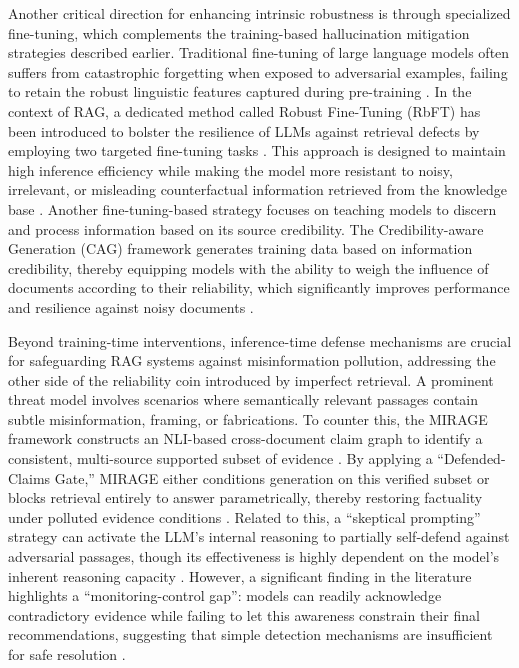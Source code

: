 \documentclass[11pt]{article}
\begin{document}
Another critical direction for enhancing intrinsic robustness is through specialized fine-tuning, which complements the training-based hallucination mitigation strategies described earlier. Traditional fine-tuning of large language models often suffers from catastrophic forgetting when exposed to adversarial examples, failing to retain the robust linguistic features captured during pre-training \cite{ref209}. In the context of RAG, a dedicated method called Robust Fine-Tuning (RbFT) has been introduced to bolster the resilience of LLMs against retrieval defects by employing two targeted fine-tuning tasks \cite{ref210}. This approach is designed to maintain high inference efficiency while making the model more resistant to noisy, irrelevant, or misleading counterfactual information retrieved from the knowledge base \cite{ref210}. Another fine-tuning-based strategy focuses on teaching models to discern and process information based on its source credibility. The Credibility-aware Generation (CAG) framework generates training data based on information credibility, thereby equipping models with the ability to weigh the influence of documents according to their reliability, which significantly improves performance and resilience against noisy documents \cite{ref211}.

Beyond training-time interventions, inference-time defense mechanisms are crucial for safeguarding RAG systems against misinformation pollution, addressing the other side of the reliability coin introduced by imperfect retrieval. A prominent threat model involves scenarios where semantically relevant passages contain subtle misinformation, framing, or fabrications. To counter this, the MIRAGE framework constructs an NLI-based cross-document claim graph to identify a consistent, multi-source supported subset of evidence \cite{ref212}. By applying a ``Defended-Claims Gate,'' MIRAGE either conditions generation on this verified subset or blocks retrieval entirely to answer parametrically, thereby restoring factuality under polluted evidence conditions \cite{ref212}. Related to this, a ``skeptical prompting'' strategy can activate the LLM's internal reasoning to partially self-defend against adversarial passages, though its effectiveness is highly dependent on the model's inherent reasoning capacity \cite{ref213}. However, a significant finding in the literature highlights a ``monitoring-control gap'': models can readily acknowledge contradictory evidence while failing to let this awareness constrain their final recommendations, suggesting that simple detection mechanisms are insufficient for safe resolution \cite{ref214}.
\end{document}
